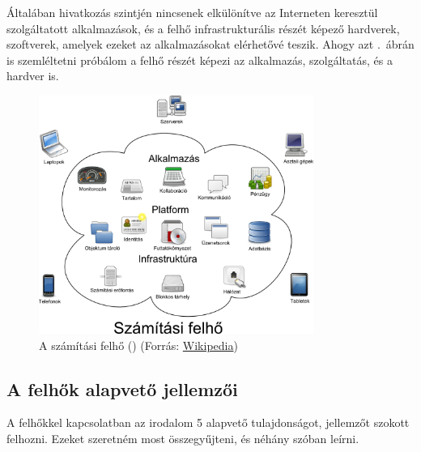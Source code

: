 Általában hivatkozás szintjén nincsenek elkülönítve az Interneten keresztül szolgáltatott alkalmazások, és a felhő infrastrukturális részét képező hardverek, szoftverek, amelyek ezeket az alkalmazásokat elérhetővé teszik. Ahogy azt .~ábrán is szemléltetni próbálom a felhő részét képezi az alkalmazás, szolgáltatás, és a hardver is.

\begin{figure}[h!]
\centering
\includegraphics[width=0.80\textwidth]{figures/Cloud_computing_hu.png}
\caption{A számítási felhő () (Forrás: \href{https://en.wikipedia.org/wiki/File:Cloud\_computing.svg}{Wikipedia})} \label{fig:cloud_computing_hu}
\end{figure}

\subsection{A felhők alapvető jellemzői}
A felhőkkel kapcsolatban az irodalom\cite{nistsp800-145} 5 alapvető tulajdonságot, jellemzőt szokott felhozni. Ezeket szeretném most összegyűjteni, és néhány szóban leírni.
 
